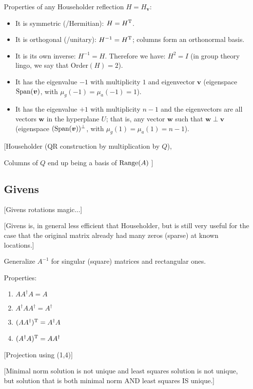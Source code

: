 \documentclass[
  12pt,
  paper=a4,
]{scrartcl} %
\begin{document}
Properties of any Householder reflection $H =H_{\bm v}$:
\begin{itemize}
    \item It is symmetric (/Hermitian): $H=H^{\mathrm{T}}$.
    \item It is orthogonal (/unitary): $H^{-1}=H^{\mathrm{T}}$; columns form an orthonormal basis.
    \item It is its own inverse: $H^{-1} = H$. Therefore we have: $H^2 = I$ (in group theory lingo, we say that $\mathrm{Order}(H)=2$).
    \item It has the eigenvalue  $-1$ with multiplicity $1$ and eigenvector $\bm v$ (eigenspace $\operatorname{Span}(\bm v)$, with $\mu_g(-1) = \mu_a(-1) = 1$).
    \item It has the eigenvalue $+1$ with multiplicity $n-1$ and the eigenvectors are all vectors $\bm w$ in the hyperplane $U$; that is, any vector $\bm w$ such that $\bm w\perp \bm v$ (eigenspace $(\operatorname{Span}(\bm v))^\perp$, with $\mu_g(1) = \mu_a(1) = n-1$).
\end{itemize}


[Householder (QR construction by multiplication by $Q$), 

Columns of $Q$ end up being a basis of $\operatorname{Range}(A)$
]

\subsection*{Givens}

[Givens rotations magic...]

[Givens is, in general less efficient that Householder, but is still very useful for the case that the original matrix already had many zeros (sparse) at known locations.]


Generalize $A^{-1}$ for singular (square) matrices and rectangular ones.

Properties:

\begin{enumerate}
    \item $A A^\dagger A = A$
    \item $A^\dagger A A^\dagger = A^\dagger$
    \item $(A A^\dagger)^{\mathrm{T}} = A^\dagger A$
    \item $(A^\dagger A)^{\mathrm{T}} = A A^\dagger$
\end{enumerate}

[Projection using (1,4)]

[Minimal norm solution is not unique and least squares solution is not unique, but solution that is both minimal norm AND least squares IS unique.]
\end{document}
